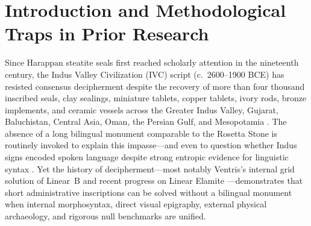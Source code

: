 \documentclass[11pt,a4paper]{article}
\begin{document}
\begin{abstract}
Sangam/Tamil-Brahmi epigraphy (\textbf{52} attested pure-Dravidian compounds, $z = +6.89$, $P = 0.00020$, vs \textbf{0} Prakrit loans, 16 MW-IA, 4 Ur~III; 34 non-numeral lexical-only compounds, $z = +7.72$, $P = 0.00020$; uncurated 14,206-word DEDR Tamil lock $P = 0.0192$), whole-object multi-face accounting (\textbf{434/606 = 71.62\%} intact multi-face objects 100\%-decoded; 81.6\% \texttt{WHO$\parallel$MEASURE} complementarity, $P = 0.00020$; rank-to-partner-class $\chi^2 = 67.12$, $P = 0.00080$), blind physical archaeology and 600-year stratigraphic stability (Elite 778.4 vs Subordinate 531.2~mm$^2$, $P = 0.00020$; 19/32 Wave-5/6 object/site predictions confirmed at $P < 0.05$; 24/24 Wave-5/6 and 21/21 Key~\#5 families flat across 2,589 dated events), and five independent external bridges (copper tablet bilinguals \texttt{923}$\leftrightarrow$Elephant 11/11, $P = 3.81 \times 10^{-16}$; Unicorn W-stand workshop lock \texttt{405} 22/22, $P = 1.06 \times 10^{-9}$; pre-city Period~1--2 continuity 83.64\%; Megalithic pottery graffiti $1.69\times$, $P = 0.0086$). All 32+ scripts, 66 headline claims, and \textbf{94} transparently registered honest nulls are verified end-to-end by \texttt{reproduce\_all\_keys.py} and \texttt{verify\_key8\_e2e.py}.
\end{abstract}

\section{Introduction and Methodological Traps in Prior Research}

Since Harappan steatite seals first reached scholarly attention in the nineteenth century, the Indus Valley Civilization (IVC) script (c.\ 2600--1900 BCE) has resisted consensus decipherment despite the recovery of more than four thousand inscribed seals, clay sealings, miniature tablets, copper tablets, ivory rods, bronze implements, and ceramic vessels across the Greater Indus Valley, Gujarat, Baluchistan, Central Asia, Oman, the Persian Gulf, and Mesopotamia \citep{mahadevan1977,parpola1994,kenoyer1998,possehl2002,wells2015}. The absence of a long bilingual monument comparable to the Rosetta Stone is routinely invoked to explain this impasse—and even to question whether Indus signs encoded spoken language \citep{farmer2004} despite strong entropic evidence for linguistic syntax \citep{rao2009science}. Yet the history of decipherment—most notably Ventris's internal grid solution of Linear~B \citep{ventris1956} and recent progress on Linear Elamite \citep{desset2022}—demonstrates that short administrative inscriptions can be solved without a bilingual monument when internal morphosyntax, direct visual epigraphy, external physical archaeology, and rigorous null benchmarks are unified.
\end{document}

